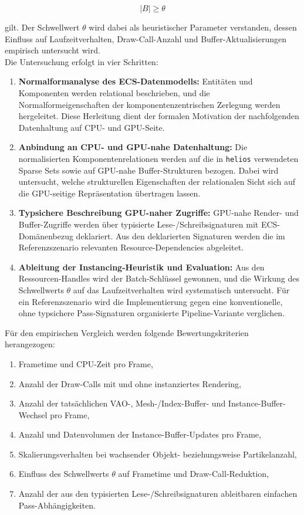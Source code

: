 \[
    |B| \geq \theta
\]

\noindent
gilt.
Der Schwellwert \(\theta\) wird dabei als heuristischer Parameter verstanden, dessen Einfluss auf Laufzeitverhalten, Draw-Call-Anzahl und Buffer-Aktualisierungen empirisch untersucht wird.\\

Die Untersuchung erfolgt in vier Schritten:

\begin{enumerate}
    \item \textbf{Normalformanalyse des ECS-Datenmodells:} Entitäten und Komponenten werden relational beschrieben, und die Normalformeigenschaften der komponentenzentrischen Zerlegung werden hergeleitet.
    Diese Herleitung dient der formalen Motivation der nachfolgenden Datenhaltung auf CPU- und GPU-Seite.

    \item \textbf{Anbindung an CPU- und GPU-nahe Datenhaltung:} Die normalisierten Komponentenrelationen werden auf die in \texttt{helios} verwendeten Sparse Sets sowie auf GPU-nahe Buffer-Strukturen bezogen.
    Dabei wird untersucht, welche strukturellen Eigenschaften der relationalen Sicht sich auf die GPU-seitige Repräsentation übertragen lassen.

    \item \textbf{Typsichere Beschreibung GPU-naher Zugriffe:} GPU-nahe Render- und Buffer-Zugriffe werden über typisierte Lese-/Schreibsignaturen mit ECS-Domänenbezug deklariert.
    Aus den deklarierten Signaturen werden die im Referenzszenario relevanten Resource-Dependencies abgeleitet.

    \item \textbf{Ableitung der Instancing-Heuristik und Evaluation:} Aus den Ressourcen-Handles wird der Batch-Schlüssel gewonnen, und die Wirkung des Schwellwerts \(\theta\) auf das Laufzeitverhalten wird systematisch untersucht.
    Für ein Referenzszenario wird die Implementierung gegen eine konventionelle, ohne typsichere Pass-Signaturen organisierte Pipeline-Variante verglichen.
\end{enumerate}

Für den empirischen Vergleich werden folgende Bewertungskriterien herangezogen:

\begin{enumerate}
    \item Frametime und CPU-Zeit pro Frame,
    \item Anzahl der Draw-Calls mit und ohne instanziertes Rendering,
    \item Anzahl der tatsächlichen VAO-, Mesh-/Index-Buffer- und Instance-Buffer-Wechsel pro Frame,
    \item Anzahl und Datenvolumen der Instance-Buffer-Updates pro Frame,
    \item Skalierungsverhalten bei wachsender Objekt- beziehungsweise Partikelanzahl,
    \item Einfluss des Schwellwerts \(\theta\) auf Frametime und Draw-Call-Reduktion,
    \item Anzahl der aus den typisierten Lese-/Schreibsignaturen ableitbaren einfachen Pass-Abhängigkeiten.
\end{enumerate}

